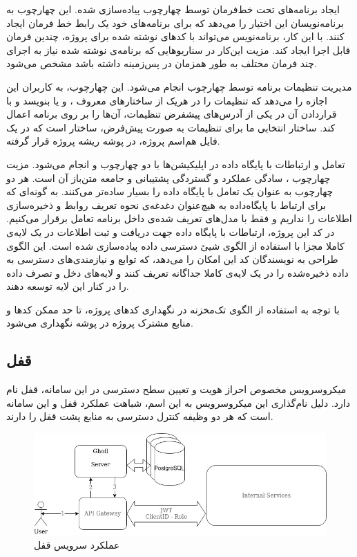 ایجاد برنامه‌های تحت خط‌فرمان توسط چهارچوب  پیاده‌سازی شده. این چهارچوب به برنامه‌نویسان این اختیار ‌را می‌دهد که برای برنامه‌های خود یک رابط خط فرمان ایجاد کنند. با این کار، برنامه‌نویس می‌تواند با کد‌های نوشته شده برای پروژه، چندین فرمان قابل اجرا ایجاد کند. مزیت این‌کار در سناریو‌هایی که برنامه‌ی‌ نوشته شده نیاز به اجرای چند فرمان مختلف به طور همزمان در پس‌زمینه داشته باشد مشخص می‌شود.

مدیریت تنظیمات برنامه توسط چهارچوب  انجام می‌شود. این چهارچوب، به کاربران این اجازه را می‌دهد که تنظیمات را در هر‌یک از ساختارهای معروف ، و یا  بنویسد و با قراردادن آن در یکی از آدرس‌های پیشفرض تنظیمات، آن‌ها را بر روی برنامه اعمال کند. ساختار انتخابی ما برای تنظیمات به صورت پیش‌فرض، ساختار  است که در یک فایل هم‌اسم پروژه، در پوشه ریشه پروژه قرار گرفته.

تعامل و ارتباطات با پایگاه داده در اپلیکیشن‌ها با دو چهارچوب  و  انجام می‌شود. مزیت چهارچوب ، سادگی عملکرد و گستردگی پشتیبانی و جامعه متن‌باز آن است. هر دو چهارچوب به عنوان یک  تعامل با پایگاه داده را بسیار ساده‌تر می‌کنند. به گونه‌ای که برای ارتباط با پایگاه‌داده به هیچ‌عنوان دغدغه‌ی نحوه تعریف روابط و ذخیره‌سازی اطلاعات را نداریم و فقط با مدل‌های تعریف شده‌ی داخل برنامه تعامل برقرار می‌کنیم. در کد این پروژه، ارتباطات با پایگاه داده جهت دریافت و ثبت اطلاعات در یک لایه‌ی کاملا مجزا با استفاده از الگوی شیئ دسترسی داده پیاده‌سازی شده است. این الگوی طراحی به نویسندگان کد این امکان را می‌‌دهد، که توابع و نیازمندی‌های دسترسی به داده ذخیره‌شده را در یک لایه‌ی کاملا جداگانه تعریف کنند و لایه‌های دخل و تصرف داده را در کنار این لایه توسعه دهند\cite{oracle_dao}.


با توجه به استفاده از الگوی تک‌مخزنه در نگهداری کد‌های پروژه، تا حد ممکن کد‌ها و منابع مشترک پروژه در پوشه  نگهداری می‌شود. 

\subsection{قفل}
میکروسرویس مخصوص احراز‌ هویت و تعیین سطح دسترسی در این سامانه، قفل نام دارد. دلیل نام‌گذاری این میکروسرویس به این اسم، شباهت عملکرد قفل و این سامانه است که هر دو وظیفه کنترل دسترسی به منابع پشت قفل را دارند.

\begin{figure}
	\centering
	\includegraphics[scale=0.5]{figures/30bird-ghofl.jpg}
	\caption{عملکرد سرویس قفل}
	\label{fig:30bird-ghofl}
\end{figure}

